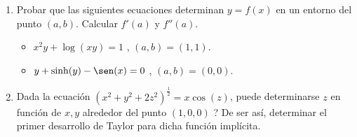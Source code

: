 \documentclass[11pt]{book}
\theoremstyle{definicion}
\theoremstyle{teorema}
\theoremstyle{ejemplo}
\begin{document}
\begin{enumerate} %
\item
Probar que las siguientes ecuaciones determinan $y=f(x)$ en un entorno del punto $(a,b)$.
Calcular $f'(a)$ y $f''(a)$.
\begin{itemize}
\item[(a)] $x^{2}y+\log(xy)=1$ , $(a,b)=(1,1)$.
\item[(b)] $y+\sinh(y)-\sen(x)=0$ , $(a,b)=(0,0)$. %
\end{itemize}

\item Dada la ecuaci\'on $(x^2+y^2+2z^2)^{\frac{1}{2}}=x\cos(z)$, puede determinarse $z$ en funci\'on de $x,y$ alrededor del punto $(1,0,0)$ ?
De ser as\'i, determinar el primer desarrollo de Taylor para dicha funci\'on impl\'icita. 
\end{enumerate}





\end{document}
